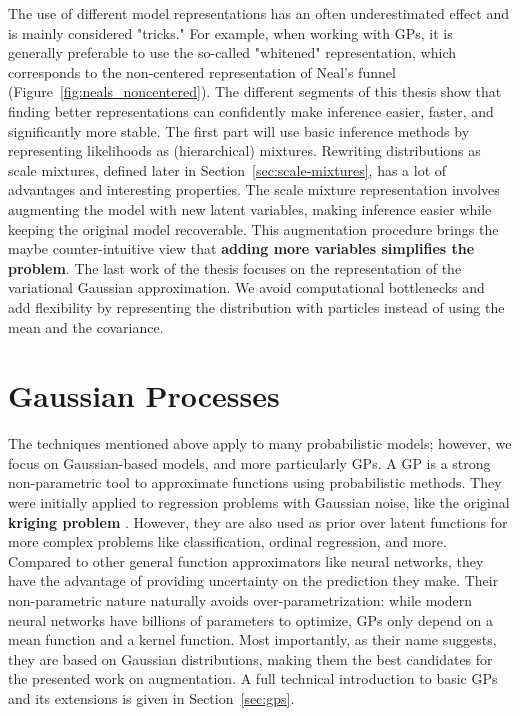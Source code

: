 The use of different model representations has an often underestimated effect and is mainly considered "tricks."
For example, when working with \acl{GPs}, it is generally preferable to use the so-called "whitened" representation, which corresponds to the non-centered representation of Neal's funnel (Figure~\ref{fig:neals_noncentered}).
The different segments of this thesis show that finding better representations can confidently make inference easier, faster, and significantly more stable. 
The first part will use basic inference methods by representing likelihoods as (hierarchical) mixtures.
Rewriting distributions as scale mixtures, defined later in Section~\ref{sec:scale-mixtures}, has a lot of advantages and interesting properties.
The scale mixture representation involves augmenting the model with new latent variables, making inference easier while keeping the original model recoverable.
This augmentation procedure brings the maybe counter-intuitive view that \textbf{adding more variables simplifies the problem}.
The last work of the thesis focuses on the representation of the variational Gaussian approximation.
We avoid computational bottlenecks and add flexibility by representing the distribution with particles instead of using the mean and the covariance.

\section{Gaussian Processes}

The techniques mentioned above apply to many probabilistic models; however, we focus on Gaussian-based models, and more particularly \acf{GPs}.
A \ac{GP} is a strong non-parametric tool to approximate functions using probabilistic methods.
They were initially applied to regression problems with Gaussian noise, like the original \textbf{kriging problem} \cite{cressie1990origins}.
However, they are also used as prior over latent functions for more complex problems like classification, ordinal regression, and more.
Compared to other general function approximators like neural networks, they have the advantage of providing uncertainty on the prediction they make.
Their non-parametric nature naturally avoids over-parametrization: while modern neural networks have billions of parameters to optimize, \ac{GPs} only depend on a mean function and a kernel function.
Most importantly, as their name suggests, they are based on Gaussian distributions, making them the best candidates for the presented work on augmentation.
A full technical introduction to basic \ac{GPs} and its extensions is given in Section~\ref{sec:gps}.


